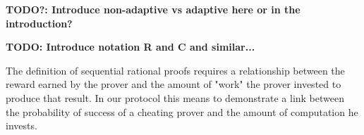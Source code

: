 \textbf{TODO?: Introduce non-adaptive vs adaptive here or in the introduction?}

\textbf{TODO: Introduce notation R and C and similar...}




The definition of sequential rational proofs requires a relationship between the reward earned by the prover and the amount of "work" the prover invested to produce that result. In our protocol this means to demonstrate a link between the probability of success of a cheating prover and the amount of computation he invests.

